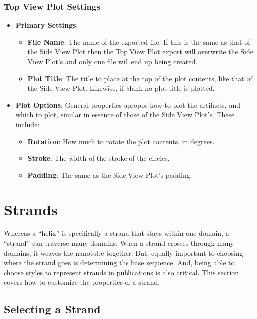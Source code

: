 \documentclass[titlepage]{article}
\begin{document}
\subsubsection{Top View Plot Settings}

\begin{itemize}
	\item \textbf{Primary Settings}: 
	\begin{itemize}
		\item \textbf{File Name}: The name of the exported file. If this is the same as that of the Side View Plot then the Top View Plot export will overwrite the Side View Plot's and only one file will end up being created.
		\item \textbf{Plot Title}: The title to place at the top of the plot contents, like that of the Side View Plot. Likewise, if blank no plot title is plotted.
	\end{itemize}
	
	\item \textbf{Plot Options}: General properties apropos how to plot the artifacts, and which to plot, similar in essence of those of the Side View Plot's. These include:
	\begin{itemize}
		\item \textbf{Rotation}: How much to rotate the plot contents, in degrees.
		\item \textbf{Stroke}: The width of the stroke of the circles.
		\item \textbf{Padding}: The same as the Side View Plot's padding.
	\end{itemize}
\end{itemize}

\section{Strands}

Whereas a ``helix'' is specifically a strand that stays within one domain, a ``strand'' can traverse many domains. When a strand crosses through many domains, it weaves the nanotube together. But, equally important to choosing where the strand goes is determining the base sequence. And, being able to choose styles to represent strands in publications is also critical. This section covers how to customize the properties of a strand.

\subsection{Selecting a Strand}
\end{document}
